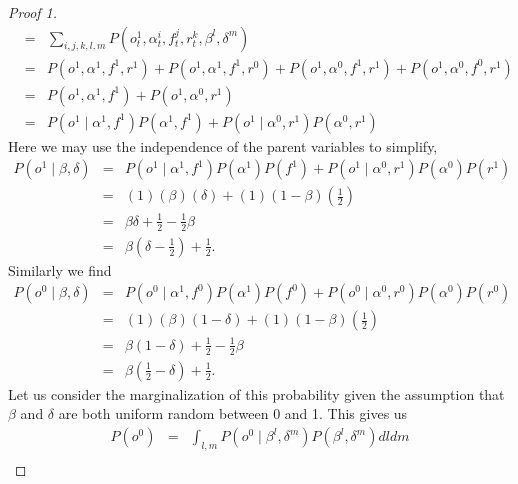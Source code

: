 \documentclass{amsart}
\theoremstyle{plain}
\numberwithin{equation}{section}
\begin{document}
\begin{proof}[Proof 1]
\begin{eqnarray*}
&=&\sum_{i,j,k,l,m}P\left( o_{t}^{1},\alpha
_{t}^{i},f_{t}^{j},r_{t}^{k},\beta ^{l},\delta ^{m}\right)  \\
&=&P\left( o^{1},\alpha ^{1},f^{1},r^{1}\right) +P\left( o^{1},\alpha
^{1},f^{1},r^{0}\right) +P\left( o^{1},\alpha ^{0},f^{1},r^{1}\right)
+P\left( o^{1},\alpha ^{0},f^{0},r^{1}\right)  \\
&=&P\left( o^{1},\alpha ^{1},f^{1}\right) +P\left( o^{1},\alpha
^{0},r^{1}\right)  \\
&=&P\left( o^{1}\mid \alpha ^{1},f^{1}\right) P\left( \alpha
^{1},f^{1}\right) +P\left( o^{1}\mid \alpha ^{0},r^{1}\right) P\left( \alpha
^{0},r^{1}\right) 
\end{eqnarray*}%
Here we may use the independence of the parent variables to simplify,%
\begin{eqnarray*}
P\left( o^{1}\mid \beta ,\delta \right)  &=&P\left( o^{1}\mid \alpha
^{1},f^{1}\right) P\left( \alpha ^{1}\right) P\left( f^{1}\right) +P\left(
o^{1}\mid \alpha ^{0},r^{1}\right) P\left( \alpha ^{0}\right) P\left(
r^{1}\right)  \\
&=&\left( 1\right) \left( \beta \right) \left( \delta \right) +\left(
1\right) \left( 1-\beta \right) \left( \frac{1}{2}\right)  \\
&=&\beta \delta +\frac{1}{2}-\frac{1}{2}\beta  \\
&=&\beta \left( \delta -\frac{1}{2}\right) +\frac{1}{2}.
\end{eqnarray*}%
Similarly we find%
\begin{eqnarray*}
P\left( o^{0}\mid \beta ,\delta \right)  &=&P\left( o^{0}\mid \alpha
^{1},f^{0}\right) P\left( \alpha ^{1}\right) P\left( f^{0}\right) +P\left(
o^{0}\mid \alpha ^{0},r^{0}\right) P\left( \alpha ^{0}\right) P\left(
r^{0}\right)  \\
&=&\left( 1\right) \left( \beta \right) \left( 1-\delta \right) +\left(
1\right) \left( 1-\beta \right) \left( \frac{1}{2}\right)  \\
&=&\beta \left( 1-\delta \right) +\frac{1}{2}-\frac{1}{2}\beta  \\
&=&\beta \left( \frac{1}{2}-\delta \right) +\frac{1}{2}.
\end{eqnarray*}%
Let us consider the marginalization of this probability given the assumption
that $\beta $ and $\delta $ are both uniform random between 0 and 1. This
gives us 
\begin{eqnarray*}
P\left( o^{0}\right)  &=&\int_{l,m}P\left( o^{0}\mid \beta ^{l},\delta
^{m}\right) P\left( \beta ^{l},\delta ^{m}\right) dldm \\

\end{eqnarray*}
\end{proof}
\end{document}

